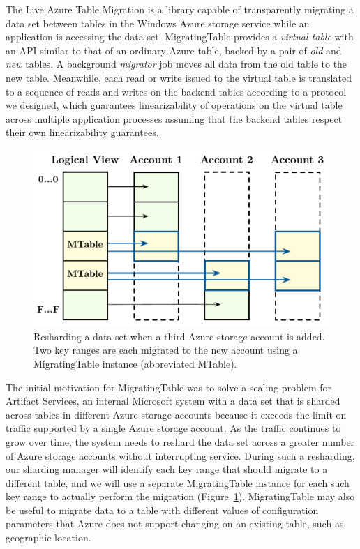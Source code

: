 The Live Azure Table Migration is a library capable of transparently migrating a data set between tables in the Windows Azure storage service while an application is accessing the data set.  MigratingTable provides a \emph{virtual table} with an API similar to that of an ordinary Azure table, backed by a pair of \emph{old} and \emph{new} tables.  A background \emph{migrator} job moves all data from the old table to the new table.  Meanwhile, each read or write issued to the virtual table is translated to a sequence of reads and writes on the backend tables according to a protocol we designed, which guarantees linearizability of operations on the virtual table across multiple application processes assuming that the backend tables respect their own linearizability guarantees.

\begin{figure}[t]
\centering
\includegraphics[width=\linewidth]{img/livemigration}
\caption{Resharding a data set when a third Azure storage account is added. Two key ranges are each migrated to the new account using a MigratingTable instance (abbreviated MTable).}
\label{fig:livemigration}
\end{figure}

The initial motivation for MigratingTable was to solve a scaling problem for Artifact Services, an internal Microsoft system with a data set that is sharded across tables in different Azure storage accounts because it exceeds the limit on traffic supported by a single Azure storage account.  As the traffic continues to grow over time, the system needs to reshard the data set across a greater number of Azure storage accounts without interrupting service.  During such a resharding, our sharding manager will identify each key range that should migrate to a different table, and we will use a separate MigratingTable instance for each such key range to actually perform the migration (Figure~\ref{fig:livemigration}).  MigratingTable may also be useful to migrate data to a table with different values of configuration parameters that Azure does not support changing on an existing table, such as geographic location.

